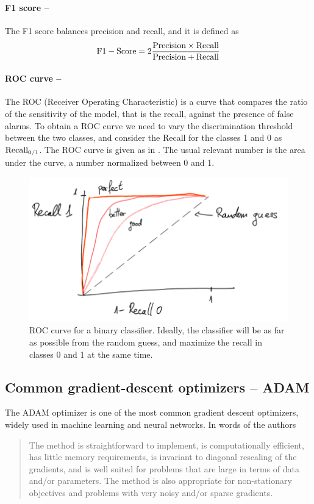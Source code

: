 \documentclass[]{report}
\begin{document}
\paragraph{F1 score --} The F1 score balances precision and recall, and it is defined as
\begin{equation}
{\rm F1-Score} = 2 \frac{{\rm Precision} \times {\rm Recall}}{{\rm Precision} + {\rm Recall}}
\end{equation}

\paragraph{ROC curve --}
The ROC (Receiver Operating Characteristic) is a curve that compares the ratio of the sensitivity of the model, that is the recall, against the presence of false alarms. To obtain a ROC curve we need to vary the discrimination threshold between the two classes, and consider the Recall for the classes 1 and 0 as ${\rm Recall_{0 / 1}}$. The ROC curve is given as in . The usual relevant number is the area under the curve, a number normalized between 0 and 1. 

\begin{figure}
\centering
\includegraphics[width = .8\linewidth]{images/ROC}
\caption{ROC curve for a binary classifier. Ideally, the classifier will be as far as possible from the random guess, and maximize the recall in classes 0 and 1 at the same time. }
\label{fig.roc}
\end{figure}

\subsection{Common gradient-descent optimizers -- ADAM}

The ADAM optimizer \cite{kingma2017adam} is one of the most common gradient descent optimizers, widely used in machine learning and neural networks. In words of the authors 
\begin{quote}
The method is straightforward to implement, is computationally efficient,
has little memory requirements, is invariant to diagonal rescaling of the gradients,
and is well suited for problems that are large in terms of data and/or parameters.
The method is also appropriate for non-stationary objectives and problems with
very noisy and/or sparse gradients.
\end{quote}
\end{document}
